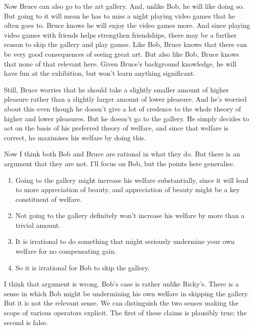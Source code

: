 Now Bruce can also go to the art gallery. And, unlike Bob, he will like doing so. But going to it will mean he has to miss a night playing video games that he often goes to. Bruce knows he will enjoy the video games more. And since playing video games with friends helps strengthen friendships, there may be a further reason to skip the gallery and play games. Like Bob, Bruce knows that there can be very good consequences of seeing great art. But also like Bob, Bruce knows that none of that relevant here. Given Bruce's background knowledge, he will have fun at the exhibition, but won't learn anything significant.

Still, Bruce worries that he should take a slightly smaller amount of higher pleasure rather than a slightly larger amount of lower pleasure. And he's worried about this even though he doesn't give a lot of credence to the whole theory of higher and lower pleasures. But he doesn't go to the gallery. He simply decides to act on the basis of his preferred theory of welfare, and since that welfare is correct, he maximises his welfare by doing this.

Now I think both Bob and Bruce are rational in what they do. But there is an argument that they are not. I'll focus on Bob, but the points here generalise. 

\begin{enumerate}
\item Going to the gallery might increase his welfare substantially, since it will lead to more appreciation of beauty, and appreciation of beauty might be a key constituent of welfare.

\item Not going to the gallery definitely won't increase his welfare by more than a trivial amount.

\item It is irrational to do something that might seriously undermine your own welfare for no compensating gain.

\item So it is irrational for Bob to skip the gallery.

\end{enumerate}
I think that argument is wrong. Bob's case is rather unlike Ricky's. There is a sense in which Bob might be undermining his own welfare in skipping the gallery. But it is not the relevant sense. We can distinguish the two senses making the scope of various operators explicit. The first of these claims is plausibly true; the second is false.

